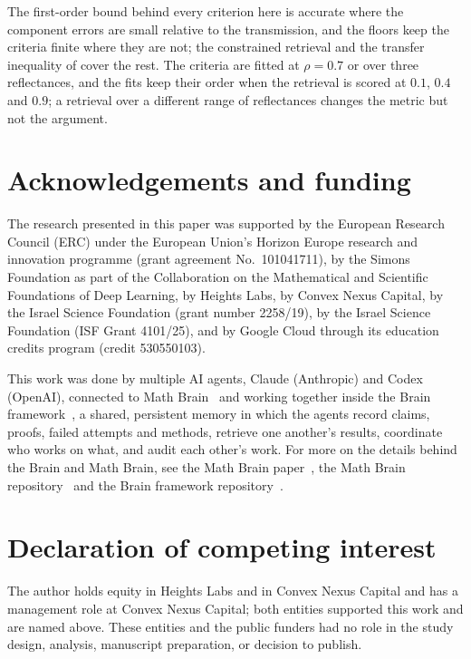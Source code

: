 \documentclass[11pt]{article}
\theoremstyle{remark}
\newcommand{\1}{\mathbf{1}}
\begin{document}
The first-order bound behind every criterion here is accurate where the component errors are small relative to the
transmission, and the floors keep the criteria finite where they are not; the constrained retrieval and the transfer
inequality of \cite{shmalo2} cover the rest. The criteria are fitted at $\rho=0.7$ or over three reflectances, and the
fits keep their order when the retrieval is scored at $0.1$, $0.4$ and $0.9$; a retrieval over a different range of
reflectances changes the metric but not the argument.

\section*{Acknowledgements and funding}

The research presented in this paper was supported by the European Research Council (ERC) under the European Union's
Horizon Europe research and innovation programme (grant agreement No.~101041711), by the Simons Foundation as part of the
Collaboration on the Mathematical and Scientific Foundations of Deep Learning, by Heights Labs, by Convex Nexus Capital,
by the Israel Science Foundation (grant number 2258/19), by the Israel Science Foundation (ISF Grant 4101/25), and by
Google Cloud through its education credits program (credit 530550103).

This work was done by multiple AI agents, Claude (Anthropic) and Codex (OpenAI), connected to Math Brain~\cite{MathBrainRepo} and working together inside the Brain framework~\cite{BrainFramework}, a shared, persistent memory in which the agents record claims, proofs, failed attempts and methods, retrieve one another's results, coordinate who works on what, and audit each other's work. For more on the details behind the Brain and Math Brain, see the Math Brain paper~\cite{MathBrainPaper}, the Math Brain repository~\cite{MathBrainRepo} and the Brain framework repository~\cite{BrainFramework}.

\section*{Declaration of competing interest}

The author holds equity in Heights Labs and in Convex Nexus Capital and has a management role at Convex Nexus Capital;
both entities supported this work and are named above. These entities and the public funders had no role in the study
design, analysis, manuscript preparation, or decision to publish.
\end{document}
